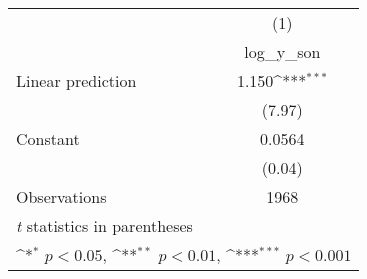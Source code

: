 {
\def\sym#1{\ifmmode^{#1}\else\(^{#1}\)\fi}
\begin{tabular}{l*{1}{c}}
\hline\hline
                    &\multicolumn{1}{c}{(1)}\\
                    &\multicolumn{1}{c}{log\_y\_son}\\
\hline
Linear prediction   &       1.150\sym{***}\\
                    &      (7.97)         \\
[1em]
Constant            &      0.0564         \\
                    &      (0.04)         \\
\hline
Observations        &        1968         \\
\hline\hline
\multicolumn{2}{l}{\footnotesize \textit{t} statistics in parentheses}\\
\multicolumn{2}{l}{\footnotesize \sym{*} \(p<0.05\), \sym{**} \(p<0.01\), \sym{***} \(p<0.001\)}\\
\end{tabular}
}

